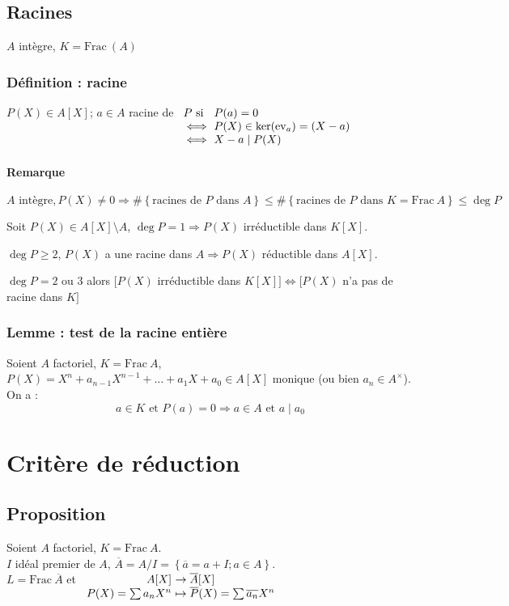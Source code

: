 \documentclass[reqno,a4paper,10pt]{report}
\makeatletter
\newcommand{\set}[1]{\left\lbrace #1 \right\rbrace} %
\newcommand{\Frac}{\mathrm{Frac}\:} %
\newcommand{\so}{\Rightarrow}
\newcommand{\soo}{\Longrightarrow}
\newcommand{\ev}[1]{\mathrm{ev}_{ #1 }}
\newcommand{\et}{\text{ et }}
\newcommand{\ou}{\text{ ou }}
\let\olditemize=\itemize%
\renewenvironment{itemize}{%
    \olditemize%
  }{%
    \@noparlisttrue%
    \endlist%
  }%
\makeatother
\begin{document}
\subsection{Racines}
$A$ intègre, $K=\Frac(A)$

\subsubsection{Définition : racine}
$P(X)\in A[X]$; $a\in A$ racine de
$
\begin{array}[t]{l@{\ }l}
  P \text{ si } &P(a)=0\\
  \iff &P(X)\in \ker(\ev a)=(X-a) \\
\iff &X-a \mid P(X)
\end{array}
$

\paragraph{Remarque}
\begin{itemize}
  \item $A \text{ intègre}, P(X)\neq 0 \so \# \set{\text{racines de }P
    \text{ dans }A} \leq \#\set{\text{racines de }P\text{ dans }K=\Frac
    A}\leq \deg P$
  \item Soit $P(X) \in A[X]\setminus A$, $\deg P=1 \so P(X)$ irréductible dans
    $K[X]$.
  \item $\deg P \geq 2$, $P(X)$ a une racine dans $A\so P(X)$ réductible dans
    $A[X]$. 
  \item $\deg P =2 \ou 3$ alors $[P(X)$ irréductible dans $K[X]] \iff [P(X)$
    n'a pas de racine dans $K]$
\end{itemize}

\subsubsection{Lemme : test de la racine entière}
Soient $A$ factoriel, $K=\Frac A$, $P(X)=X^n+a_{n-1} X^{n-1}+ \dots + a_1 X +
a_0 \in A[X]$ monique (ou bien $a_n \in A^\times$). On a :
\[a\in K \et P(a)=0 \soo a\in A \et a \mid a_0\]

\section{Critère de réduction}
\subsection{Proposition}
Soient $A$ factoriel, $K=\Frac A$.\\
$I$ idéal premier de $A$, $\overline A = A/I = \set{\overline a = a+I;
a \in A}$.\\
$L=\Frac \overline A$ et $
\begin{array}[t]{r@{\ }l}
  A[X] &\to \overline A[X]\\
  P(X)=\sum a_n X^n &\mapsto \overline P (X) = \sum \overline{a_n} X^n
\end{array}
  $
\end{document}
